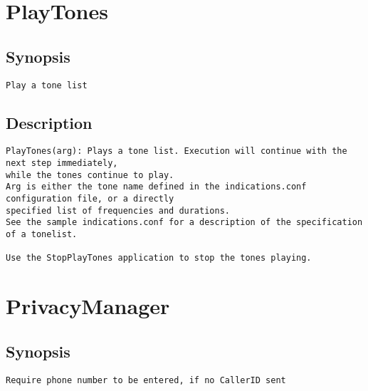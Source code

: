 \section{PlayTones}
\subsection{Synopsis}
\begin{verbatim}
Play a tone list
\end{verbatim}
\subsection{Description}
\begin{verbatim}
PlayTones(arg): Plays a tone list. Execution will continue with the next step immediately,
while the tones continue to play.
Arg is either the tone name defined in the indications.conf configuration file, or a directly
specified list of frequencies and durations.
See the sample indications.conf for a description of the specification of a tonelist.

Use the StopPlayTones application to stop the tones playing. 

\end{verbatim}


\section{PrivacyManager}
\subsection{Synopsis}
\begin{verbatim}
Require phone number to be entered, if no CallerID sent
\end{verbatim}
